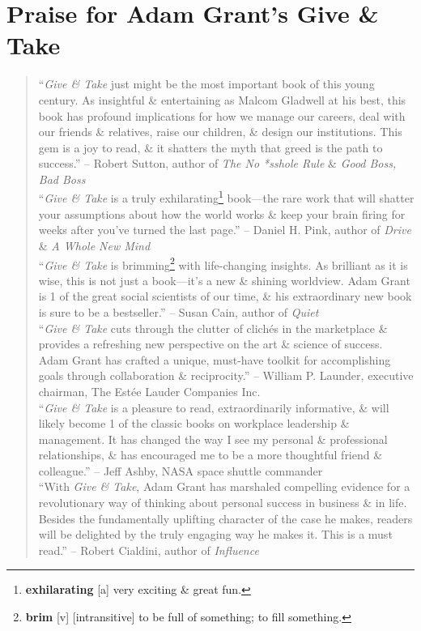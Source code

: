 \documentclass[oneside]{book}
\numberwithin{equation}{section}
\begin{document}
\section*{Praise for Adam Grant's Give \& Take}
\begin{quotation}
	``\textit{Give \& Take} just might be the most important book of this young century. As insightful \& entertaining as Malcom Gladwell at his best, this book has profound implications for how we manage our careers, deal with our friends \& relatives, raise our children, \& design our institutions. This gem is a joy to read, \& it shatters the myth that greed is the path to success.'' -- Robert Sutton, author of \textit{The No *sshole Rule} \& \textit{Good Boss, Bad Boss}\\
	
	``\textit{Give \& Take} is a truly exhilarating\footnote{\textbf{exhilarating} [a] very exciting \& great fun.} book---the rare work that will shatter your assumptions about how the world works \& keep your brain firing for weeks after you've turned the last page.'' -- Daniel H. Pink, author of \textit{Drive} \& \textit{A Whole New Mind}\\
	
	``\textit{Give \& Take} is brimming\footnote{\textbf{brim} [v] [intransitive] to be full of something; to fill something.} with life-changing insights. As brilliant as it is wise, this is not just a book---it's a new \& shining worldview. Adam Grant is 1 of the great social scientists of our time, \& his extraordinary new book is sure to be a bestseller.'' -- Susan Cain, author of \textit{Quiet}\\
	
	``\textit{Give \& Take} cuts through the clutter of clich\'es in the marketplace \& provides a refreshing new perspective on the art \& science of success. Adam Grant has crafted a unique, must-have toolkit for accomplishing goals through collaboration \& reciprocity.'' -- William P. Launder, executive chairman, The Est\'ee Lauder Companies Inc.\\
	
	``\textit{Give \& Take} is a pleasure to read, extraordinarily informative, \& will likely become 1 of the classic books on workplace leadership \& management. It has changed the way I see my personal \& professional relationships, \& has encouraged me to be a more thoughtful friend \& colleague.'' -- Jeff Ashby, NASA space shuttle commander\\
	
	``With \textit{Give \& Take}, Adam Grant has marshaled compelling evidence for a revolutionary way of thinking about personal success in business \& in life. Besides the fundamentally uplifting character of the case he makes, readers will be delighted by the truly engaging way he makes it. This is a must read.'' -- Robert Cialdini, author of \textit{Influence}\\
	

\end{quotation}
\end{document}
